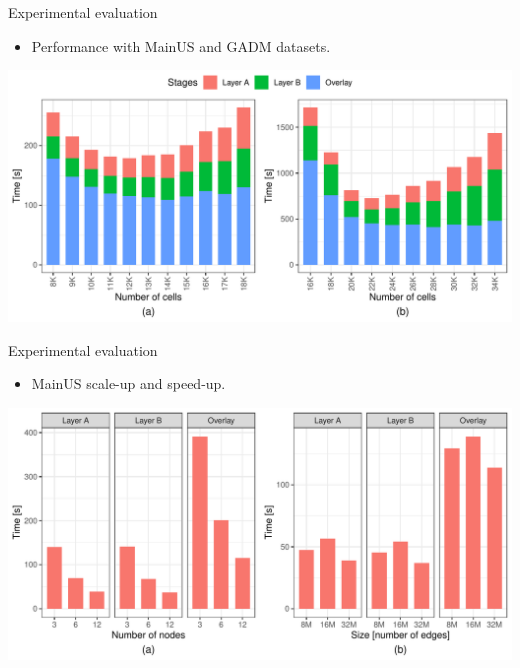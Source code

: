     \begin{frame}{Experimental evaluation}
        \begin{itemize}
            \item Performance with MainUS and GADM datasets.
        \end{itemize}
        \vspace{5mm}
        \includegraphics[width=\textwidth]{../thesis/chapterSDCEL/Performance/Performance}
    \end{frame}

    \begin{frame}{Experimental evaluation}
        \begin{itemize}
            \item MainUS scale-up and speed-up.
        \end{itemize}
        \vspace{5mm}
        \includegraphics[width=\textwidth]{../thesis/chapterSDCEL/MainUS_SS/MainUS_SS}
    \end{frame}

